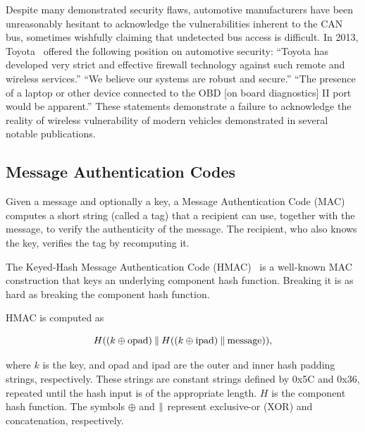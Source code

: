 Despite many demonstrated security flaws, automotive 
manufacturers have been unreasonably hesitant to acknowledge the vulnerabilities inherent to the CAN bus,
sometimes wishfully claiming that undetected bus access is difficult. 
In 2013, Toyota~\cite{bbc_toyota} offered the following position on automotive security: 
``Toyota has developed very strict and effective firewall technology against such remote and wireless services.'' 
``We believe our systems are robust and secure.'' 
``The presence of a laptop or other device connected to the OBD [on board diagnostics] II port would be apparent.'' 
These statements demonstrate a failure to acknowledge the 
reality of wireless vulnerability of modern vehicles demonstrated in several notable publications.

\subsection{Message Authentication Codes}

Given a message and optionally a key, a Message Authentication Code (MAC) computes a short string (called a tag) 
that a recipient can use, together with the message, to verify the authenticity of the message.  
The recipient, who also knows the key, 
verifies the tag by recomputing it.

The Keyed-Hash Message Authentication Code (HMAC)~\cite{HMAC,FIPS-198-1,rfc2104,nist107} 
is a well-known MAC construction that keys an underlying component hash function.  
Breaking it is as hard as breaking the component hash function.

HMAC is computed as

\begin{equation}
H((k\oplus \text{opad})\mathbin{\|} H((k\oplus \text{ipad})\mathbin{\|} \text{message})) ,
\end{equation}

\noindent
where $k$ is the key, and opad and ipad are the outer and inner hash padding strings, respectively. 
These strings are constant strings defined by 0x5C and 0x36, repeated until the hash input is of the appropriate length. 
$H$ is the component hash function. 
The symbols $\oplus$ and $\mathbin{\|}$ represent exclusive-or (XOR) and concatenation, respectively.





